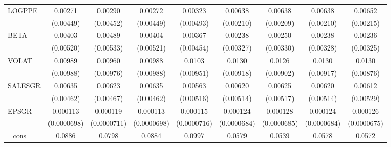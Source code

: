 \begin{table}[htbp]
\begin{tabular}{l*{8}{c}}
LOGPPE              &     0.00271         &     0.00290         &     0.00272         &     0.00323         &     0.00638\sym{***}&     0.00638\sym{***}&     0.00638\sym{***}&     0.00652\sym{***}\\
                    &   (0.00449)         &   (0.00452)         &   (0.00449)         &   (0.00493)         &   (0.00210)         &   (0.00209)         &   (0.00210)         &   (0.00215)         \\
BETA                &     0.00403         &     0.00489         &     0.00404         &     0.00367         &     0.00238         &     0.00250         &     0.00238         &     0.00236         \\
                    &   (0.00520)         &   (0.00533)         &   (0.00521)         &   (0.00454)         &   (0.00327)         &   (0.00330)         &   (0.00328)         &   (0.00325)         \\
VOLAT               &     0.00989         &     0.00960         &     0.00988         &      0.0103         &      0.0130         &      0.0126         &      0.0130         &      0.0130         \\
                    &   (0.00988)         &   (0.00976)         &   (0.00988)         &   (0.00951)         &   (0.00918)         &   (0.00902)         &   (0.00917)         &   (0.00876)         \\
SALESGR             &     0.00635         &     0.00623         &     0.00635         &     0.00563         &     0.00620         &     0.00625         &     0.00620         &     0.00612         \\
                    &   (0.00462)         &   (0.00467)         &   (0.00462)         &   (0.00516)         &   (0.00514)         &   (0.00517)         &   (0.00514)         &   (0.00529)         \\
EPSGR               &    0.000113         &    0.000119\sym{*}  &    0.000113         &    0.000115         &    0.000124\sym{*}  &    0.000128\sym{*}  &    0.000124\sym{*}  &    0.000126\sym{*}  \\
                    & (0.0000698)         & (0.0000711)         & (0.0000698)         & (0.0000716)         & (0.0000684)         & (0.0000685)         & (0.0000684)         & (0.0000675)         \\
\_cons              &      0.0886         &      0.0798         &      0.0884         &      0.0997\sym{*}  &      0.0579\sym{*}  &      0.0539         &      0.0578\sym{*}  &      0.0572\sym{*}  \\

\end{tabular}
\end{table}
